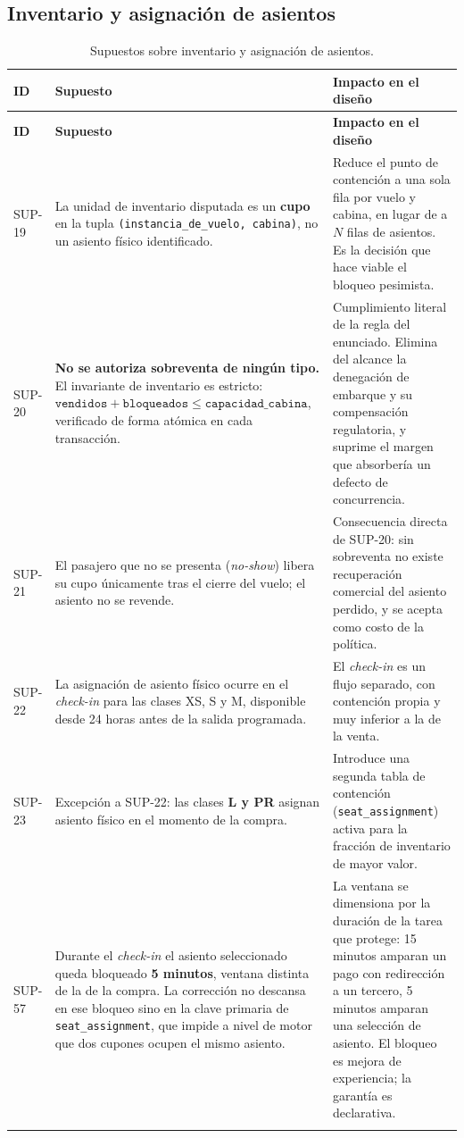\documentclass[10pt,letterpaper]{article}
\begin{document}
\subsection{Inventario y asignación de asientos}
\begin{longtable}{@{}L{1.7cm} L{7.4cm} L{6.1cm}@{}}
\toprule
\textbf{ID} & \textbf{Supuesto} & \textbf{Impacto en el diseño} \\
\midrule
\endfirsthead
\toprule
\textbf{ID} & \textbf{Supuesto} & \textbf{Impacto en el diseño} \\
\midrule
\endhead
SUP-19 & La unidad de inventario disputada es un \textbf{cupo} en la tupla \texttt{(instancia\_de\_vuelo, cabina)}, no un asiento físico identificado. & Reduce el punto de contención a una sola fila por vuelo y cabina, en lugar de a $N$ filas de asientos. Es la decisión que hace viable el bloqueo pesimista. \\
SUP-20 & \textbf{No se autoriza sobreventa de ningún tipo.} El invariante de inventario es estricto: $\texttt{vendidos} + \texttt{bloqueados} \le \texttt{capacidad\_cabina}$, verificado de forma atómica en cada transacción. & Cumplimiento literal de la regla del enunciado. Elimina del alcance la denegación de embarque y su compensación regulatoria, y suprime el margen que absorbería un defecto de concurrencia. \\
SUP-21 & El pasajero que no se presenta (\emph{no-show}) libera su cupo únicamente tras el cierre del vuelo; el asiento no se revende. & Consecuencia directa de SUP-20: sin sobreventa no existe recuperación comercial del asiento perdido, y se acepta como costo de la política. \\
SUP-22 & La asignación de asiento físico ocurre en el \emph{check-in} para las clases XS, S y M, disponible desde 24 horas antes de la salida programada. & El \emph{check-in} es un flujo separado, con contención propia y muy inferior a la de la venta. \\
SUP-23 & Excepción a SUP-22: las clases \textbf{L y PR} asignan asiento físico en el momento de la compra. & Introduce una segunda tabla de contención (\texttt{seat\_assignment}) activa para la fracción de inventario de mayor valor. \\
SUP-57 & Durante el \emph{check-in} el asiento seleccionado queda bloqueado \textbf{5 minutos}, ventana distinta de la de la compra. La corrección no descansa en ese bloqueo sino en la clave primaria de \texttt{seat\_assignment}, que impide a nivel de motor que dos cupones ocupen el mismo asiento. & La ventana se dimensiona por la duración de la tarea que protege: 15 minutos amparan un pago con redirección a un tercero, 5 minutos amparan una selección de asiento. El bloqueo es mejora de experiencia; la garantía es declarativa. \\
\bottomrule
\caption{Supuestos sobre inventario y asignación de asientos.}
\end{longtable}
\end{document}

